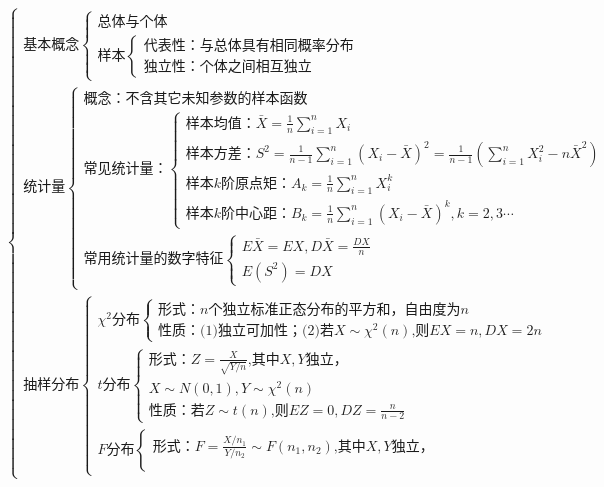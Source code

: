 \documentclass[lang=cn,11pt]{elegantbook}
\begin{document}
{\small
\[
\begin{cases}
\text{基本概念}
\begin{cases}
\text{总体与个体} \\
\text{样本}
\begin{cases}
\text{代表性：与总体具有相同概率分布} \\
\text{独立性：个体之间相互独立}
\end{cases}
\end{cases} \\
\text{统计量}
\begin{cases}
\text{概念：不含其它未知参数的样本函数} \\
\text{常见统计量：}
\begin{cases}
\text{样本均值：}\bar{X}=\displaystyle\frac{1}{n}\sum_{i=1}^n X_i \\
\text{样本方差：}S^2=\displaystyle\frac{1}{n-1}\sum_{i=1}^n (X_i-\bar{X})^2=\frac{1}{n-1}\left(\sum_{i=1}^n X_i^2-n\bar{X}^2\right) \\
\text{样本}k\text{阶原点矩：}A_k=\displaystyle\frac{1}{n}\sum_{i=1}^n X_i^k \\
\text{样本}k\text{阶中心距：}B_k=\displaystyle\frac{1}{n}\sum_{i=1}^n (X_i-\bar{X})^k,k=2,3\cdots
\end{cases} \\
\text{常用统计量的数字特征}
\begin{cases}
E\bar{X}=EX,D\bar{X}=\displaystyle\frac{DX}{n} \\
E(S^2)=DX
\end{cases}
\end{cases} \\
\text{抽样分布}
\begin{cases}
\chi^2\text{分布}
\begin{cases}
\text{形式：}n\text{个独立标准正态分布的平方和，自由度为}n \\
\text{性质：(1)独立可加性；(2)若}X\sim\chi^2(n)\text{,则}EX=n,DX=2n
\end{cases} \\
t\text{分布}
\begin{cases}
\text{形式：}Z=\displaystyle\frac{X}{\sqrt{Y/n}}\text{,其中}X,Y\text{独立，} \\
X\sim N(0,1),Y\sim\chi^2(n) \\
\text{性质：若}Z\sim t(n)\text{,则}EZ=0,DZ=\displaystyle\frac{n}{n-2}
\end{cases} \\
F\text{分布}
\begin{cases}
\text{形式：}F=\displaystyle\frac{X/n_1}{Y/n_2}\sim F(n_1,n_2)\text{,其中}X,Y\text{独立，} \\

\end{cases}
\end{cases}
\end{cases}\]}
\end{document}
